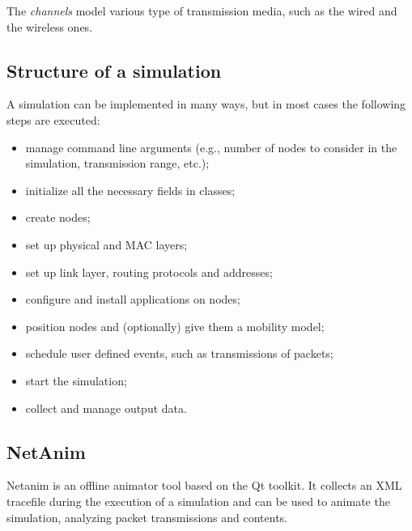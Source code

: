 		
		The \textit{channels} model various type of transmission media, such as the wired and the wireless ones.
	
		\subsection{Structure of a simulation}
			A simulation can be implemented in many ways, but in most cases the following steps are executed:
			\begin{itemize}
				\item manage command line arguments (e.g., number of nodes to consider in the simulation, transmission range, etc.);
				\item initialize all the necessary fields in classes;
				\item create nodes;
				\item set up physical and MAC layers;
				\item set up link layer, routing protocols and addresses;
				\item configure and install applications on nodes;
				\item position nodes and (optionally) give them a mobility model;
				\item schedule user defined events, such as transmissions of packets;
				\item start the simulation;
				\item collect and manage output data.
			\end{itemize}
		
		\subsection{NetAnim}
			Netanim is an offline animator tool based on the Qt toolkit. It collects an XML tracefile during the execution of a simulation and can be used to animate the simulation, analyzing packet transmissions and contents.
			
